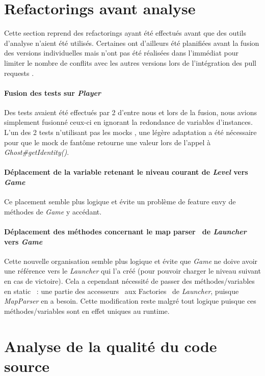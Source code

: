 \documentclass[12pt, openany]{report}
\begin{document}
\section{Refactorings avant analyse}
Cette section reprend des refactorings ayant été effectués avant que des outils d'analyse n'aient été utilisés. Certaines ont d'ailleurs été
planifiées avant la fusion des versions individuelles mais n'ont pas été réalisées dans l'immédiat pour limiter le nombre de conflits avec les autres versions lors de l'intégration des \og pull requests \fg .

\paragraph{Fusion des tests sur \textit{Player}}
Des tests avaient été effectués par 2 d’entre nous et lors de la fusion, nous avions simplement fusionné ceux-ci en ignorant la redondance de variables d’instances. L’un des 2 tests n’utilisant pas les \og mocks \fg, une légère adaptation a été nécessaire pour que le mock de fantôme retourne une valeur lors de l’appel à \mbox{\textit{Ghost\#getIdentity()}}.
\paragraph{Déplacement de la variable retenant le niveau courant de \textit{Level} vers \textit{Game}}
Ce placement semble plus logique et évite un problème de \og feature envy \fg de méthodes de \mbox{\textit{Game}} y accédant.
\paragraph{Déplacement des méthodes concernant le \og map parser \fg \, de \textit{Launcher} vers \textit{Game}}
Cette nouvelle organisation semble plus logique et évite que \mbox{\textit{Game}} ne doive avoir une référence vers le \mbox{\textit{Launcher}} qui l’a créé (pour pouvoir charger le niveau suivant en cas de victoire).
Cela a cependant nécessité de passer des méthodes/variables en \og static \fg \, : une partie des \og accesseurs \fg \, aux \og Factories \fg \, de \mbox{\textit{Launcher}}, puisque \mbox{\textit{MapParser}} en a besoin. Cette modification reste malgré tout logique puisque ces méthodes/variables sont en effet uniques au runtime.

\section{Analyse de la qualité du code source}
                                                                                                                                                                                                                                                                                                                                                                                                                                                                                                                                                                                                                                                                                                                                                 
\end{document}
